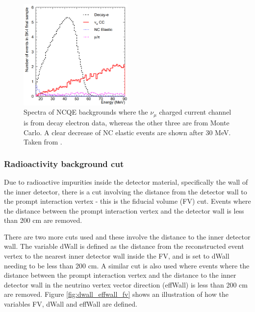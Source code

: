 \begin{figure}
\centering
\includegraphics[width=0.5\textwidth]{Figures/michel_electron.png}
\caption[Spectra of NCQE backgrounds where the $\nu_{\mu}$ charged current channel is from decay electron data, whereas the other three are from Monte Carlo.]{Spectra of NCQE backgrounds where the $\nu_{\mu}$ charged current channel is from decay electron data, whereas the other three are from Monte Carlo. A clear decrease of NC elastic events are shown after 30 MeV. Taken from \cite{michel_electron}.}
\label{fig:michel_electron}
\end{figure} 

\subsubsection{Radioactivity background cut}

Due to radioactive impurities inside the detector material, specifically the wall of the inner detector, there is a cut involving the distance from the detector wall to the prompt interaction vertex - this is the fiducial volume (FV) cut. Events where the distance between the prompt interaction vertex and the detector wall is less than 200 cm are removed.

There are two more cuts used and these involve the distance to the inner detector wall. The variable dWall is defined as the distance from the reconstructed event vertex to the nearest inner detector wall inside the FV, and is set to dWall needing to be less than 200 cm.  A similar cut is also used where events where the distance between the prompt interaction vertex and the distance to the inner detector wall in the neutrino vertex vector direction (effWall) is less than 200 cm are removed. Figure \ref{fig:dwall_effwall_fv} shows an illustration of how the variables FV, dWall and effWall are defined. 

